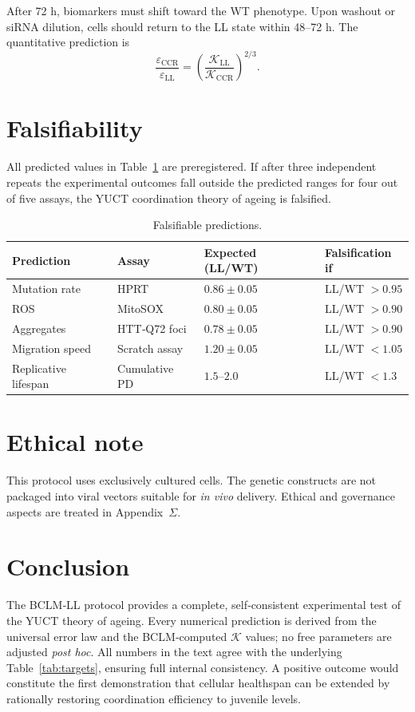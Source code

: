 \documentclass[12pt,a4paper]{article}
\newcommand{\REL}{\mathcal{K}}          %
\begin{document}
	After 72 h, biomarkers must shift toward the WT phenotype. Upon washout or siRNA dilution, cells should return to the LL state within 48–72 h. The quantitative prediction is
	\[
	\frac{\varepsilon_{\mathrm{CCR}}}{\varepsilon_{\mathrm{LL}}} = \left(\frac{\REL_{\mathrm{LL}}}{\REL_{\mathrm{CCR}}}\right)^{2/3}.
	\]
	
	\section{Falsifiability}
	\label{sec:falsifiability}
	All predicted values in Table~\ref{tab:predictions} are preregistered. If after three independent repeats the experimental outcomes fall outside the predicted ranges for four out of five assays, the YUCT coordination theory of ageing is falsified.
	
	\begin{table}[H]
		\centering
		\caption{Falsifiable predictions.}
		\label{tab:predictions}
		\begin{tabular}{@{}llll@{}}
			\toprule
			\textbf{Prediction} & \textbf{Assay} & \textbf{Expected (LL/WT)} & \textbf{Falsification if} \\
			\midrule
			Mutation rate       & HPRT           & \(0.86 \pm 0.05\) & LL/WT \(> 0.95\) \\
			ROS                 & MitoSOX        & \(0.80 \pm 0.05\) & LL/WT \(> 0.90\) \\
			Aggregates          & HTT‑Q72 foci   & \(0.78 \pm 0.05\) & LL/WT \(> 0.90\) \\
			Migration speed     & Scratch assay  & \(1.20 \pm 0.05\) & LL/WT \(< 1.05\) \\
			Replicative lifespan & Cumulative PD  & \(1.5\)–\(2.0\)    & LL/WT \(< 1.3\) \\
			\bottomrule
		\end{tabular}
	\end{table}
	
	\section{Ethical note}
	\label{sec:ethics}
	This protocol uses exclusively cultured cells. The genetic constructs are not packaged into viral vectors suitable for \textit{in vivo} delivery. Ethical and governance aspects are treated in Appendix~\(\Sigma\).
	
	\section{Conclusion}
	The BCLM‑LL protocol provides a complete, self‑consistent experimental test of the YUCT theory of ageing. Every numerical prediction is derived from the universal error law and the BCLM‑computed \(\REL\) values; no free parameters are adjusted \emph{post hoc}. All numbers in the text agree with the underlying Table~\ref{tab:targets}, ensuring full internal consistency. A positive outcome would constitute the first demonstration that cellular healthspan can be extended by rationally restoring coordination efficiency to juvenile levels.
	
\end{document}
